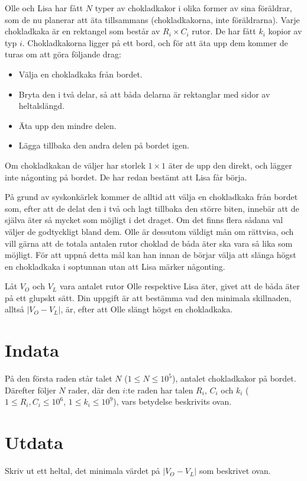 
\noindent
Olle och Lisa har fått $N$ typer av chokladkakor i olika former av sina föräldrar, som de nu planerar
att äta tillsammans (chokladkakorna, inte föräldrarna).
Varje chokladkaka är en rektangel som består av $R_i \times C_i$ rutor. De har fått $k_i$ kopior av typ $i$.
Chokladkakorna ligger på ett bord, och för att äta upp dem kommer de turas om att göra följande drag:
\begin{itemize}
  \item Välja en chokladkaka från bordet.
  \item Bryta den i två delar, så att båda delarna är rektanglar med sidor av heltalslängd.
  \item Äta upp den mindre delen.
  \item Lägga tillbaka den andra delen på bordet igen.
\end{itemize}
Om chokladkakan de väljer har storlek $1 \times 1$ äter de upp den direkt, och lägger inte någonting på bordet.
De har redan bestämt att Lisa får börja.



På grund av syskonkärlek kommer de alltid att välja en chokladkaka från bordet som,
efter att de delat den i två och lagt tillbaka den större biten,
innebär att de själva äter så mycket som möjligt i det draget.
Om det finns flera sådana val väljer de godtyckligt bland dem.
Olle är dessutom väldigt mån om rättvisa, 
och vill gärna att de totala antalen rutor choklad de båda äter ska vara så lika som möjligt.
För att uppnå detta mål kan han innan de börjar välja att slänga högst en chokladkaka i soptunnan utan att Lisa
märker någonting.



Låt $V_O$ och $V_L$ vara antalet rutor Olle respektive Lisa äter, givet att de båda äter på ett glupskt sätt. 
Din uppgift är att bestämma vad den minimala skillnaden, alltså $|V_O - V_L|$, är,
efter att Olle slängt högst en chokladkaka.


\section*{Indata}
På den första raden står talet $N$ ($1 \leq N \leq 10^5$), antalet chokladkakor på bordet.
Därefter följer $N$ rader, där den $i$:te raden har talen $R_i$, $C_i$ och $k_i$
($1 \leq R_i, C_i \leq 10^6$, $1 \leq k_i \leq 10^9$), vars betydelse beskrivits ovan.


\section*{Utdata}
Skriv ut ett heltal, det minimala värdet på $|V_O - V_L|$ som beskrivet ovan.


